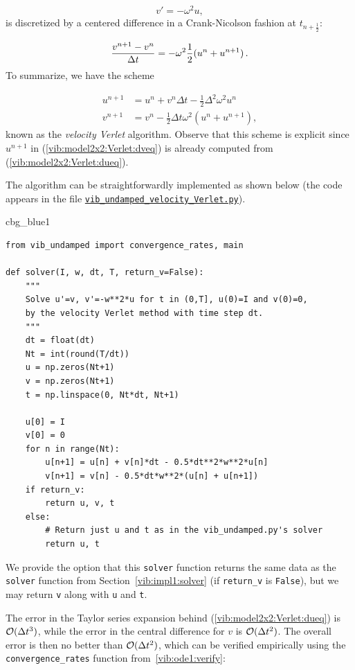 \documentclass[%
oneside,                 %
final,                   %
10pt]{article}
\newenvironment{_cod_tight}[1]{
   \def\FrameCommand{\colorbox{#1}}
   \FrameRule0.6pt\MakeFramed {\FrameRestore}\vskip3mm}
   {\vskip0mm\endMakeFramed}
\newenvironment{cod}[1]{
\bgroup\rmfamily
\fboxsep=0mm\relax
\begin{_cod_tight}{#1}
\list{}{\parsep=-2mm\parskip=0mm\topsep=0pt\leftmargin=2mm
\rightmargin=2\leftmargin\leftmargin=4pt\relax}
\item\relax}
{\endlist\end{_cod_tight}\egroup}
\begin{document}
\[ v'=-\omega^2u,\]
is discretized by a centered difference
in a Crank-Nicolson fashion at $t_{n+\frac{1}{2}}$:

\[ \frac{v^{n+1}-v^n}{\Delta t} = -\omega^2\frac{1}{2}(u^n + u^{n+1})\tp\]
To summarize, we have the scheme

\begin{align}
u^{n+1} &= u^n + v^n\Delta t - \frac{1}{2}\Delta^2\omega^2u^n
\label{vib:model2x2:Verlet:dueq} \\ 
v^{n+1} &= v^n -\frac{1}{2}\Delta t\omega^2 (u^n + u^{n+1}),
\label{vib:model2x2:Verlet:dveq}
\end{align}
known as the \emph{velocity Verlet} algorithm.
Observe that this scheme is explicit since $u^{n+1}$ in
(\ref{vib:model2x2:Verlet:dveq}) is already computed
from (\ref{vib:model2x2:Verlet:dueq}).

The algorithm can be straightforwardly implemented as shown below (the
code appears in the file \href{{http://tinyurl.com/nm5587k/vib/vib_undamped_velocity_Verlet.py}}{\nolinkurl{vib_undamped_velocity_Verlet.py}}).

\begin{cod}{cbg_blue1}\begin{Verbatim}[numbers=none,fontsize=\fontsize{9pt}{9pt},baselinestretch=0.95,xleftmargin=2mm]
from vib_undamped import convergence_rates, main

def solver(I, w, dt, T, return_v=False):
    """
    Solve u'=v, v'=-w**2*u for t in (0,T], u(0)=I and v(0)=0,
    by the velocity Verlet method with time step dt.
    """
    dt = float(dt)
    Nt = int(round(T/dt))
    u = np.zeros(Nt+1)
    v = np.zeros(Nt+1)
    t = np.linspace(0, Nt*dt, Nt+1)

    u[0] = I
    v[0] = 0
    for n in range(Nt):
        u[n+1] = u[n] + v[n]*dt - 0.5*dt**2*w**2*u[n]
        v[n+1] = v[n] - 0.5*dt*w**2*(u[n] + u[n+1])
    if return_v:
        return u, v, t
    else:
        # Return just u and t as in the vib_undamped.py's solver
        return u, t
\end{Verbatim}
\end{cod}
\noindent
We provide the option that this \texttt{solver} function returns the same data
as the \texttt{solver} function from Section~\ref{vib:impl1:solver} (if \Verb!return_v!
is \texttt{False}), but we may return \texttt{v} along with \texttt{u} and \texttt{t}.

The error in the Taylor series expansion behind
(\ref{vib:model2x2:Verlet:dueq}) is $\Oof{\Delta t^3}$, while the error
in the central difference for $v$ is $\Oof{\Delta t^2}$.  The overall
error is then no better than $\Oof{\Delta t^2}$, which can be verified
empirically using the \Verb!convergence_rates! function from~\ref{vib:ode1:verify}:
\end{document}
